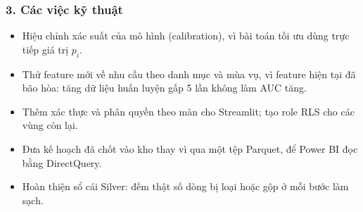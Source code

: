 \subsubsection*{3. Các việc kỹ thuật}
\begin{itemize}
    \item Hiệu chỉnh xác suất của mô hình (calibration), vì bài toán tối ưu dùng trực tiếp giá trị $p_i$.
    \item Thử feature mới về nhu cầu theo danh mục và mùa vụ, vì feature hiện tại đã bão hòa: tăng dữ liệu huấn luyện gấp 5 lần không làm AUC tăng.
    \item Thêm xác thực và phân quyền theo màn cho Streamlit; tạo role RLS cho các vùng còn lại.
    \item Đưa kế hoạch đã chốt vào kho thay vì qua một tệp Parquet, để Power BI đọc bằng DirectQuery.
    \item Hoàn thiện sổ cái Silver: đếm thật số dòng bị loại hoặc gộp ở mỗi bước làm sạch.
\end{itemize}

